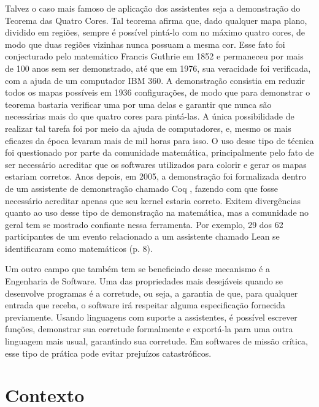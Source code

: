 \documentclass[12pt, oneside, a4paper,english,brazil]{abntex2}
\begin{document}
\qquad Talvez o caso mais famoso de aplicação dos assistentes seja a demonstração do
Teorema das Quatro Cores. Tal teorema afirma que, dado qualquer mapa plano, dividido
em regiões, sempre é possível pintá-lo com no máximo quatro cores, de modo que duas
regiões vizinhas nunca possuam a mesma cor. Esse fato foi conjecturado pelo matemático
Francis Guthrie em 1852 e permaneceu por mais de 100 anos sem ser demonstrado, até
que em 1976, sua veracidade foi verificada, com a ajuda de um computador IBM 360. A
demonstração consistia em reduzir todos os mapas possíveis em 1936 configurações, de
modo que para demonstrar o teorema bastaria verificar uma por uma delas e garantir que
nunca são necessárias mais do que quatro cores para pintá-las. A única possibilidade de
realizar tal tarefa foi por meio da ajuda de computadores, e, mesmo os mais eficazes da
época levaram mais de mil horas para isso. O uso desse tipo de técnica foi questionado por
parte da comunidade matemática, principalmente pelo fato de ser necessário acreditar que
os softwares utilizados para colorir e gerar os mapas estariam corretos. Anos depois, em
2005, a demonstração foi formalizada dentro de um assistente de demonstra\c{c}\~ao chamado Coq \cite{fourcolor}, fazendo com
que fosse necessário acreditar apenas que seu kernel estaria correto. Exitem divergências
quanto ao uso desse tipo de demonstração na matemática, mas a comunidade no geral
tem se mostrado confiante nessa ferramenta. Por exemplo, 29 dos 62 participantes de um evento
relacionado a um assistente chamado Lean \cite{2} se identificaram como matemáticos \cite{hitchhiker} (p. 8).

\qquad Um outro campo que também tem se beneficiado desse mecanismo é a Engenharia
de Software. Uma das propriedades mais desejáveis quando se desenvolve programas é a
corretude, ou seja, a garantia de que, para qualquer entrada que receba, o software irá
respeitar alguma especificação fornecida previamente. Usando linguagens com suporte a
assistentes, é possível escrever funções, demonstrar sua corretude formalmente e exportá-la
para uma outra linguagem mais usual, garantindo sua corretude. Em softwares de miss\~ao cr\'itica,
esse tipo de prática pode evitar prejuízos catastróficos.

\section{Contexto}
\end{document}
